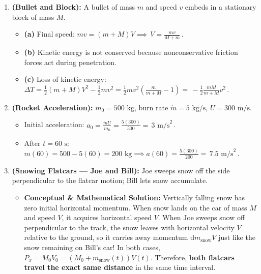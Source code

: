 \documentclass[11pt,a4paper,openany,oneside]{book}
\newcommand{\eqbox}[1]{\boxed{\,#1\,}}
\newcommand{\diff}{\mathrm{d}}
\numberwithin{equation}{chapter}
\begin{document}
\begin{enumerate}[label=\textbf{Ex.\ 6.\arabic*},leftmargin=3.5em]
  \item \textbf{(Bullet and Block):} A bullet of mass $m$ and speed $v$ embeds in a stationary block of mass $M$.
  \begin{itemize}
    \item \textbf{(a)} Final speed: $mv = (m+M)V \implies \eqbox{V = \frac{mv}{M+m}}$.
    \item \textbf{(b)} Kinetic energy is not conserved because nonconservative friction forces act during penetration.
    \item \textbf{(c)} Loss of kinetic energy: $\Delta T = \frac{1}{2}(m+M)V^2 - \frac{1}{2}mv^2 = \frac{1}{2}mv^2\!\left(\frac{m}{m+M}-1\right) = \eqbox{-\frac{1}{2}\frac{mM}{m+M}v^2}$.
  \end{itemize}

  \item \textbf{(Rocket Acceleration):} $m_0 = 500\text{ kg}$, burn rate $\dot{m} = 5\text{ kg/s}$, $U = 300\text{ m/s}$.
  \begin{itemize}
    \item Initial acceleration: $a_0 = \frac{\dot{m}U}{m_0} = \frac{5(300)}{500} = \eqbox{3\text{ m/s}^2}$.
    \item After $t = 60\text{ s}$: $m(60) = 500 - 5(60) = 200\text{ kg} \implies a(60) = \frac{5(300)}{200} = \eqbox{7.5\text{ m/s}^2}$.
  \end{itemize}

  \item \textbf{(Snowing Flatcars --- Joe and Bill):} Joe sweeps snow off the side perpendicular to the flatcar motion; Bill lets snow accumulate.
  \begin{itemize}
    \item \textbf{Conceptual \& Mathematical Solution:} Vertically falling snow has zero initial horizontal momentum. When snow lands on the car of mass $M$ and speed $V$, it acquires horizontal speed $V$. When Joe sweeps snow off perpendicular to the track, the snow leaves with horizontal velocity $V$ relative to the ground, so it carries away momentum $\diff m_{\text{snow}}V$ just like the snow remaining on Bill's car! In both cases, $P_x = M_0 V_0 = (M_0 + m_{\text{snow}}(t))V(t)$. Therefore, \textbf{both flatcars travel the exact same distance} in the same time interval.
  \end{itemize}


\end{enumerate}
\end{document}

